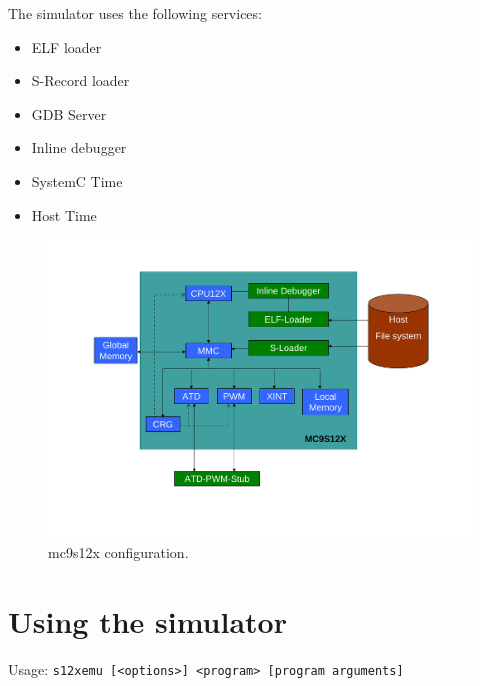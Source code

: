 The simulator uses the following services:
\begin{itemize}\addtolength{\itemsep}{-0.40\baselineskip}
\item ELF loader
\item S-Record loader
\item GDB Server
\item Inline debugger
\item SystemC Time
\item Host Time
\end{itemize}

\begin {figure}[h]
	\centering
		\includegraphics[width=1\textwidth]{mc9s12xdp512/mc9s12xdp512_schema.pdf}
	\caption {mc9s12x configuration.}
	\label {fig:mc9s12xdp512}
\end {figure}

\section{Using the simulator}

Usage: \texttt{s12xemu [<options>] <program> [program arguments]}
\\

